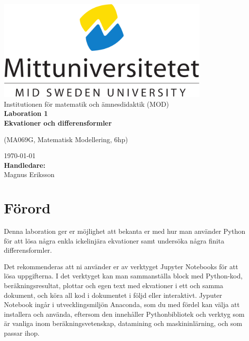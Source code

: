 \documentclass[a4paper]{article}
\newcommand{\gettitle}{Laboration 1 \\ Ekvationer och differensformler} %
\newcommand{\getcourse}{(MA069G, Matematisk Modellering, 6hp)} %
\newcommand{\getsupervisor}{Magnus Eriksson}
\begin{document}
\begin{titlepage}
  \begin{center}
    \vspace*{1cm}
    \includegraphics[width=0.8\textwidth]{msu.png}\\[0.5cm]
    \Large
    Institutionen för matematik och ämnesdidaktik (MOD)\\[1cm]
    \Huge
    \textbf{\gettitle}

    \large
    \getcourse{}

    \vspace{1cm}

    \vfill
    \vspace{0.8cm}
    \small
    \today \\
    \Large
    \textbf{Handledare:}\\
    \getsupervisor{}
  \end{center}
\end{titlepage}

\tableofcontents
\newpage

\section{Förord}
Denna laboration ger er möjlighet att bekanta er med hur man använder
Python för att lösa några enkla ickelinjära ekvationer samt undersöka
några finita differensformler.

Det rekommenderas att ni använder er av verktyget Jupyter Notebooks för att lösa
uppgifterna. I det verktyget kan man sammanställa block med Python-kod, beräkningsresultat,
plottar och egen text med ekvationer i ett och samma dokument, och köra all kod i dokumentet
i följd eller interaktivt. Jyputer Notebook ingår i utvecklingsmiljön Anaconda, som du med
fördel kan välja att installera och använda, eftersom den innehåller Pythonbibliotek och
verktyg som är vanliga inom beräkningsvetenskap, datamining och maskininlärning, och som passar ihop.
\end{document}
